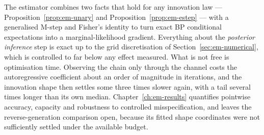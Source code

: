 The estimator combines two facts that hold for any innovation law ---
Proposition~\ref{prop:em-unary} and Proposition~\ref{prop:em-estep} --- with a
generalised M-step and Fisher's identity to turn exact BP conditional
expectations into a marginal-likelihood gradient. Everything about the
\emph{posterior inference} step is exact up to the grid discretisation of
Section~\ref{sec:em-numerical}, which is controlled to far below any effect
measured. What is not free is optimisation time. Observing the chain only
through the channel costs the autoregressive coefficient about an order of
magnitude in iterations, and the innovation shape then settles some three times
slower again, with a tail several times longer than its own median.
Chapter~\ref{ch:em-results} quantifies pointwise accuracy, capacity and
robustness to controlled misspecification, and leaves the reverse-generation
comparison open, because its fitted shape coordinates were not sufficiently
settled under the available budget.

